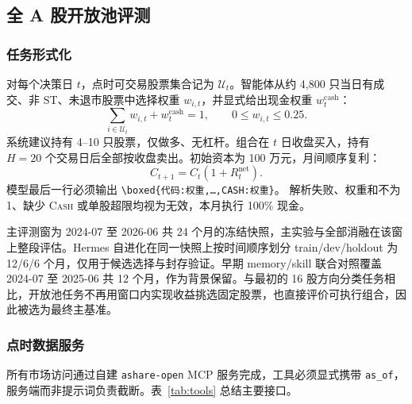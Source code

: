 \documentclass[11pt]{article}
\newcommand{\cash}{\textsc{Cash}}
\begin{document}
\subsection{全 A 股开放池评测}
\label{sec:benchmark}

\subsubsection{任务形式化}

对每个决策日 $t$，点时可交易股票集合记为 $\mathcal{U}_t$。智能体从约 4,800 只当日有成交、非 ST、未退市股票中选择权重 $w_{i,t}$，并显式给出现金权重 $w^{\mathrm{cash}}_t$：
\begin{equation}
  \sum_{i\in\mathcal{U}_t} w_{i,t} + w^{\mathrm{cash}}_t = 1,\qquad
  0\leq w_{i,t}\leq 0.25.
\end{equation}
系统建议持有 4--10 只股票，仅做多、无杠杆。组合在 $t$ 日收盘买入，持有 $H=20$ 个交易日后全部按收盘卖出。初始资本为 100 万元，月间顺序复利：
\begin{equation}
  C_{t+1}=C_t\left(1+R^{\mathrm{net}}_t\right).
\end{equation}
模型最后一行必须输出
\texttt{\textbackslash boxed\{代码:权重,\ldots,CASH:权重\}}。
解析失败、权重和不为 1、缺少 \cash{} 或单股超限均视为无效，本月执行 100\% 现金。

主评测窗为 2024-07 至 2026-06 共 24 个月的冻结快照，主实验与全部消融在该窗上整段评估。Hermes 自进化在同一快照上按时间顺序划分 train/dev/holdout 为 12/6/6 个月，仅用于候选选择与封存验证。早期 memory/skill 联合对照覆盖 2024-07 至 2025-06 共 12 个月，作为背景保留。与最初的 16 股方向分类任务相比，开放池任务不再用窗口内实现收益挑选固定股票，也直接评价可执行组合，因此被选为最终主基准。

\subsubsection{点时数据服务}
\label{sec:data}

所有市场访问通过自建 \texttt{ashare-open} MCP 服务完成，工具必须显式携带 \texttt{as\_of}，服务端而非提示词负责截断。表~\ref{tab:tools} 总结主要接口。
\end{document}
